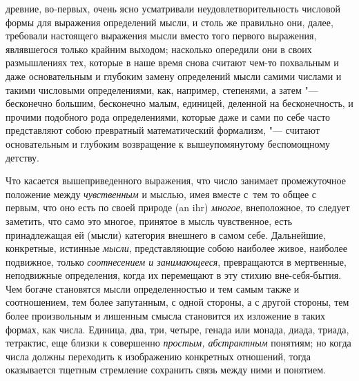 древние, во-первых, очень ясно усматривали неудовлетворительность числовой
формы для выражения определений мысли, и столь же правильно они, далее,
требовали настоящего выражения мысли вместо того первого выражения, являвшегося
только крайним выходом; насколько опередили они в своих размышлениях тех,
которые в наше время снова считают чем-то похвальным и даже основательным и
глубоким замену определений мысли самими числами и такими числовыми
определениями, как, например, степенями, а затем "--- бесконечно большим,
бесконечно малым, единицей, деленной на бесконечность, и прочими подобного рода
определениями, которые даже и сами по себе часто представляют собою
превратный математический формализм, "--- считают основательным и глубоким
возвращение к вышеупомянутому беспомощному детству.

Что касается вышеприведенного выражения, что число занимает промежуточное
положение между {\em чувственным} и мыслью, имея вместе с~тем то общее с
первым, что оно есть по своей природе (an ihr) {\em многое}, внеположное, то
следует заметить, что само это многое, принятое в мысль чувственное, есть
принадлежащая ей (мысли) категория внешнего в самом себе. Дальнейшие,
конкретные, истинные {\em мысли}, представляющие собою наиболее живое, наиболее
подвижное, только {\em соотнесением и занимающееся}, превращаются в мертвенные,
неподвижные определения, когда их перемещают в эту стихию вне-себя-бытия. Чем
богаче становятся мысли определенностью и тем самым также и соотношением, тем
более запутанным, с одной стороны, а с другой стороны, тем более произвольным и
лишенным смысла становится их изложение в таких формах, как числа. Единица,
два, три, четыре, генада или монада, диада, триада, тетрактис, еще близки к
совершенно {\em простым, абстрактным} понятиям; но когда числа должны
переходить к изображению конкретных отношений, тогда оказывается тщетным
стремление сохранить связь между ними и понятием.

